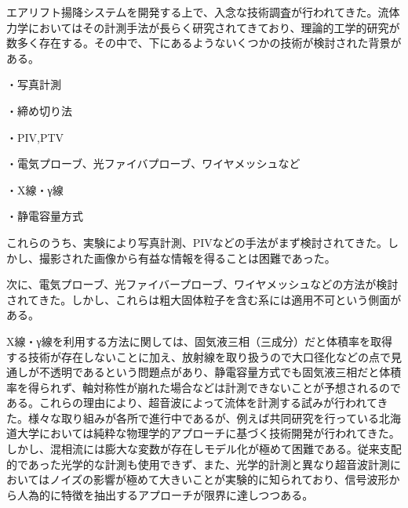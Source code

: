 \documentclass[uplatex]{suribt}
\begin{document}
エアリフト揚降システムを開発する上で、入念な技術調査が行われてきた。流体力学においてはその計測手法が長らく研究されてきており、理論的工学的研究が数多く存在する。その中で、下にあるようないくつかの技術が検討された背景がある。\par
・写真計測\par
・締め切り法\par
・PIV,PTV\par
・電気プローブ、光ファイバプローブ、ワイヤメッシュなど\par
・X線・γ線\par
・静電容量方式\par
これらのうち、実験により写真計測、PIVなどの手法がまず検討されてきた。しかし、撮影された画像から有益な情報を得ることは困難であった。\par
次に、電気プローブ、光ファイバープローブ、ワイヤメッシュなどの方法が検討されてきた。しかし、これらは粗大固体粒子を含む系には適用不可という側面がある。\par
X線・γ線を利用する方法に関しては、固気液三相（三成分）だと体積率を取得する技術が存在しないことに加え、放射線を取り扱うので大口径化などの点で見通しが不透明であるという問題点があり、静電容量方式でも固気液三相だと体積率を得られず、軸対称性が崩れた場合などは計測できないことが予想されるのである。これらの理由により、超音波によって流体を計測する試みが行われてきた。様々な取り組みが各所で進行中であるが、例えば共同研究を行っている北海道大学においては純粋な物理学的アプローチに基づく技術開発が行われてきた。しかし、混相流には膨大な変数が存在しモデル化が極めて困難である。従来支配的であった光学的な計測も使用できず、また、光学的計測と異なり超音波計測においてはノイズの影響が極めて大きいことが実験的に知られており、信号波形から人為的に特徴を抽出するアプローチが限界に達しつつある。\par
\end{document}
